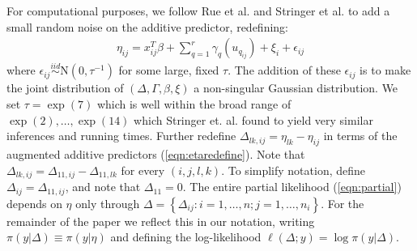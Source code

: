 \documentclass[num-refs,serif,10pt]{wiley-article}
\begin{document}
For computational purposes, we follow Rue et al. \cite{inla} and Stringer et al. \cite{casecross} to add a small random noise on the additive predictor, redefining: 
\begin{equation}\begin{aligned}\label{eqn:etaredefine}
\eta_{ij} =x_{ij}^{T}\beta+\sum_{q=1}^{r} \gamma_q(u_{q_{ij}}) +\xi_{i} + \epsilon_{ij}
\end{aligned}\end{equation}
where $\epsilon_{ij} \stackrel{iid}{\sim} \text{N}(0,\tau^{-1})$ for some large, fixed $\tau$. The addition of these $\epsilon_{ij}$ is to make the joint distribution of $\left(\Delta, \Gamma,\beta, \xi \right)$ a non-singular Gaussian distribution. We set $\tau = \exp(7)$ which is well within the broad range of $\exp(2),\ldots,\exp(14)$ which Stringer et. al. \cite{casecross} found to yield very similar inferences and running times. Further redefine $\Delta_{lk,ij} = \eta_{lk} - \eta_{ij}$ in terms of the augmented additive predictors (\ref{eqn:etaredefine}). Note that $\Delta_{lk,ij} = \Delta_{11,ij} - \Delta_{11,lk}$ for every $(i,j,l,k)$. To simplify notation, define $\Delta_{ij} = \Delta_{11,ij}$, and note that $\Delta_{11} = 0$. The entire partial likelihood (\ref{eqn:partial}) depends on $\eta$ only through  $\Delta = \left\{\Delta_{ij}: i = 1,\ldots,n; j = 1,\ldots,n_{i} \right\}$. For the remainder of the paper we reflect this in our notation, writing $\pi(y|\Delta) \equiv \pi(y|\eta)$ and defining the log-likelihood $\ell(\Delta; y) = \log\pi(y|\Delta)$.
\end{document}
